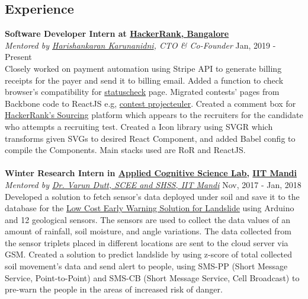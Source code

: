 \documentclass[margin, centered]{res}
\begin{document}
\begin{resume}
        \section{Experience}
            \textbf{Software Developer Intern at \href{https://www.hackerrank.com}{HackerRank, Bangalore}} \\
            \emph{Mentored by \href{https://www.hackerrank.com/about-us/our-team/}{Harishankaran 
            Karunanidni}\footnotesize{, CTO \& Co-Founder}} \hfill Jan, 2019 - Present \\
            Closely worked on payment automation using Stripe API to generate billing receipts for the payer and send it to billing email. Added a function to check browser's compatibility for \href{https://www.hackerrank.com/statuscheck}{statuscheck} page. Migrated contests' pages from Backbone code to ReactJS e.g, \href{https://www.hackerrank.com/projecteuler/}{contest projecteuler}. Created a comment box for \href{https://www.hackerrank.com/work}{HackerRank's Sourcing} platform which appears to the recruiters for the candidate who attempts a recruiting test. Created a Icon library using SVGR which transforms given SVGs to desired React Component, and added Babel config to compile the Components. Main stacks used are RoR and ReactJS. \\
            \\
            \textbf{Winter Research Intern in \href{http://acslab.org}{Applied Cognitive Science Lab,} \href{https://iitmandi.ac.in/}{IIT Mandi}} \\
            \emph{Mentored by \href{https://faculty.iitmandi.ac.in/~varun/}{Dr. Varun Dutt, SCEE and SHSS, IIT Mandi}} \hfill Nov, 2017 - Jan, 2018 \\
            Developed a solution to fetch sensor’s data deployed under soil and save it to the database for the
            \href{http://landslidemonitoring.esy.es/}{Low Cost Early Warning Solution for Landslide} using Arduino
            and 12 geological sensors. The sensors are used to collect the data values of an amount of rainfall,
            soil moisture, and angle variations. The data collected from the sensor triplets placed in different
            locations are sent to the cloud server via GSM. Created a solution to predict landslide by using z-score
            of total collected soil movement’s data and send alert to people, using SMS-PP (Short Message Service,
            Point-to-Point) and SMS-CB (Short Message Service, Cell Broadcast) to pre-warn the people in the areas
            of increased risk of danger. \\

\end{resume}
\end{document}
